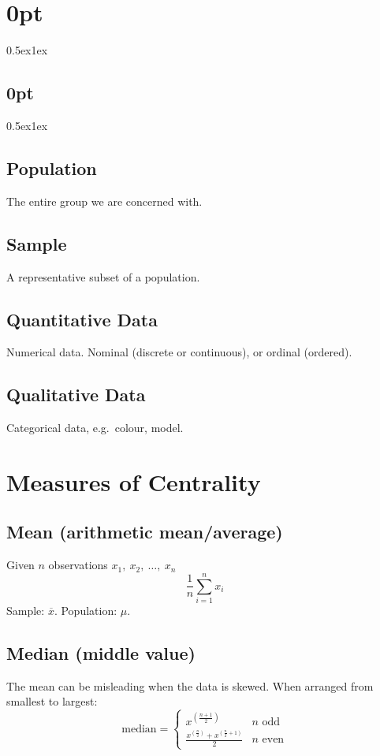 \documentclass{article}
\begin{document}
\titlespacing*\section{0pt}{0.5ex}{1ex}
\titlespacing*\subsection{0pt}{0.5ex}{1ex}
%
\setlength\abovecaptionskip{8pt}
\setlength\belowcaptionskip{-15pt}
\setlength\textfloatsep{0pt}
%
\setlength\abovedisplayskip{1pt}
\setlength\belowdisplayskip{1pt}

\begin{multicols}{3}
    \subsection{Population}
    The entire group we are concerned with.
    \subsection{Sample}
    A representative subset of a population.
    \subsection{Quantitative Data}
    Numerical data.
    Nominal (discrete or continuous), or ordinal (ordered).
    \subsection{Qualitative Data}
    Categorical data, e.g.\ colour, model.
    \section{Measures of Centrality}
    \subsection{Mean (arithmetic mean/average)}
    Given \(n\) observations \(x_1,\: x_2,\: \ldots,\: x_n\)
    \begin{equation*}
        \frac{1}{n} \sum_{i = 1}^n x_i
    \end{equation*}
    Sample: \(\overline{x}\).
    Population: \(\mu\).
    \subsection{Median (middle value)}
    The mean can be misleading when the data is skewed.
    When arranged from smallest to largest:
    \begin{equation*}
        \text{median} = \begin{cases}
            x^{\left( \frac{n + 1}{2} \right)} & n \text{ odd}
            \\
            \frac{x^{\left( \frac{n}{2} \right)} + x^{\left( \frac{n}{2} + 1 \right)}}{2}
                                               & n \text{ even}
        \end{cases}
    \end{equation*}

\end{multicols}
\end{document}
